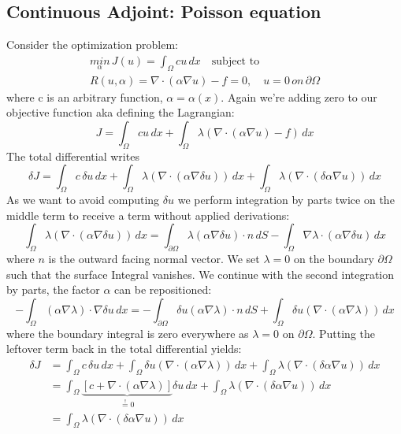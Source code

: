 \documentclass[10pt]{article}
\begin{document}
\subsection{Continuous Adjoint: Poisson equation}
Consider the optimization problem:
\begin{eqnarray}
\underset{\alpha}{min}\,J(u)=\int_{\Omega}cu \,dx\quad \text{subject to}\\
R(u,\alpha)= \nabla\cdot\left( \alpha \nabla u \right) - f =0, \quad u=0\,on \,\partial\Omega
\end{eqnarray}
where c is an arbitrary function, $\alpha = \alpha(x)$. Again we're adding zero to our objective function aka defining the Lagrangian:
\begin{equation}
J = \int_{\Omega}cu \,dx + \int_{\Omega} \lambda\left( \nabla\cdot\left( \alpha \nabla u \right) - f \right) \,dx
\end{equation}
The total differential writes
\begin{equation}
\delta J = \int_{\Omega}c\,\delta u \,dx + \int_{\Omega} \lambda\left( \nabla\cdot\left( \alpha \nabla \delta u \right)  \right) \,dx + \int_{\Omega} \lambda\left( \nabla\cdot\left( \delta\alpha \nabla  u \right)  \right) \,dx
\end{equation}
As we want to avoid computing $\delta u$ we perform integration by parts twice on the middle term to receive a term without applied derivations:
\begin{equation}
\int_{\Omega} \lambda\left( \nabla\cdot\left( \alpha \nabla \delta u \right)  \right) \,dx = \int_{\partial\Omega} \lambda \left( \alpha \nabla \delta u \right)\cdot n \,dS - \int_{\Omega} \nabla\lambda \cdot \left( \alpha \nabla \delta u \right) \,dx
\end{equation}
where $n$ is the outward facing normal vector. We set $\lambda=0$ on the boundary $\partial\Omega$ such that the surface Integral vanishes. We continue with the second integration by parts, the factor $\alpha$ can be repositioned:
\begin{equation}
- \int_{\Omega} \left(\alpha\nabla\lambda\right) \cdot \nabla \delta u \,dx = -\int_{\partial\Omega}\delta u\left(\alpha\nabla\lambda\right) \cdot n \,dS + \int_{\Omega}\delta u\left(\nabla \cdot \left(\alpha\nabla\lambda\right)\right) \,dx
\end{equation}
where the boundary integral is zero everywhere as $\lambda=0$ on $\partial\Omega$. Putting the leftover term back in the total differential yields:
\begin{align}
\delta J &= \int_{\Omega}c\,\delta u \,dx + \int_{\Omega}\delta u\left(\nabla \cdot \left(\alpha\nabla\lambda\right)\right) \,dx + \int_{\Omega} \lambda\left( \nabla\cdot\left( \delta\alpha \nabla  u \right)  \right) \,dx\\
&= \int_{\Omega} \underbrace{\left[c + \nabla \cdot \left(\alpha\nabla\lambda\right)\right]}_{\overset{!}{=} 0} \delta u \,dx + \int_{\Omega} \lambda\left( \nabla\cdot\left( \delta\alpha \nabla  u \right)  \right) \,dx \\
&= \int_{\Omega} \lambda\left( \nabla\cdot\left( \delta\alpha \nabla  u \right)  \right) \,dx 
\end{align}
\end{document}
